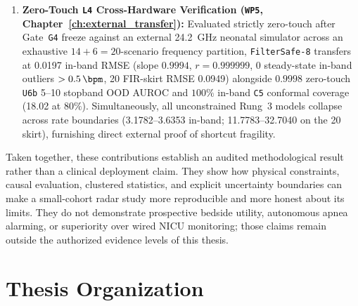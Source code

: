 \begin{enumerate}
  \item \textbf{Zero-Touch \texttt{L4} Cross-Hardware Verification (\texttt{WP5}, Chapter~\ref{ch:external_transfer}):}
    Evaluated strictly zero-touch after Gate~\texttt{G4} freeze against an external \SI{24.2}{\giga\hertz}
    neonatal simulator \citep{gleichauf2024time} across an exhaustive $14+6=20$-scenario frequency
    partition, \texttt{FilterSafe-8} transfers at \SI{0.0197}{\bpm} in-band RMSE (slope $0.9994$,
    $r=0.999999$, $0$ steady-state in-band outliers $>\SI{0.5}{\bpm}$, \SI{20}{\bpm} FIR-skirt RMSE \SI{0.0949}{\bpm}) alongside
    $0.9998$ zero-touch \texttt{U6b} \SIrange{5}{10}{\bpm} stopband OOD AUROC and $100\%$ in-band \texttt{C5} conformal
    coverage (\SI{18.02}{\bpm} at $80\%$). Simultaneously, all unconstrained Rung~3 models collapse across
    rate boundaries (\SIrange{3.1782}{3.6353}{\bpm} in-band; \SIrange{11.7783}{32.7040}{\bpm} on the
    \SI{20}{\bpm} skirt), furnishing direct external proof of shortcut fragility.
\end{enumerate}

Taken together, these contributions establish an audited methodological result rather than a
clinical deployment claim. They show how physical constraints, causal evaluation, clustered
statistics, and explicit uncertainty boundaries can make a small-cohort radar study more
reproducible and more honest about its limits. They do not demonstrate prospective bedside utility,
autonomous apnea alarming, or superiority over wired NICU monitoring; those claims remain outside
the authorized evidence levels of this thesis.

\section{Thesis Organization}
\label{sec:ch1_organization}

